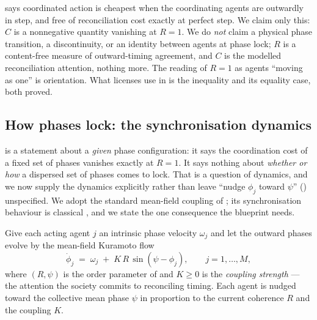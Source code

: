 \documentclass[11pt,twocolumn,a4paper]{article}
\newcommand{\Ord}{R}                 %
\newcommand{\phase}{\phi}
\begin{document}
\begin{remark}
\label{rem:phaselock-scope}
 says coordinated action is cheapest when the
coordinating agents are outwardly in step, and free of reconciliation cost
exactly at perfect step. We claim only this: $C$ is a nonnegative quantity
vanishing at $\Ord=1$. We do \emph{not} claim a physical phase transition,
a discontinuity, or an identity between agents at phase lock; $\Ord$ is a
content-free measure of outward-timing agreement, and $C$ is the modelled
reconciliation attention, nothing more. The reading of $\Ord=1$ as agents
``moving as one'' is orientation. What licenses use in 
is the inequality and its equality case, both proved.
\end{remark}

\subsection{How phases lock: the synchronisation dynamics}
\label{sec:sync-dynamics}

 is a statement about a \emph{given} phase
configuration: it says the coordination cost of a fixed set of phases
vanishes exactly at $\Ord=1$. It says nothing about \emph{whether or how}
a dispersed set of phases comes to lock. That is a question of dynamics, and
we now supply the dynamics explicitly rather than leave ``nudge $\phase_j$
toward $\psi$'' () unspecified. We adopt the standard
mean-field coupling of \cite{kuramoto1984}; its synchronisation behaviour
is classical \cite{strogatz2000,acebron2005,pikovsky2001}, and we state
the one consequence the blueprint needs.

\begin{definition}
\label{def:kuramoto}
Give each acting agent $j$ an intrinsic phase velocity $\omega_j$ and let
the outward phases evolve by the mean-field Kuramoto flow
\[
\dot{\phase}_j \;=\; \omega_j \;+\; K\,\Ord\,\sin(\psi-\phase_j),
\qquad j=1,\dots,M,
\]
where $(\Ord,\psi)$ is the order parameter of  and
$K\ge0$ is the \emph{coupling strength} --- the attention the society
commits to reconciling timing. Each agent is nudged toward the collective
mean phase $\psi$ in proportion to the current coherence $\Ord$ and the
coupling $K$.
\end{definition}
\end{document}
